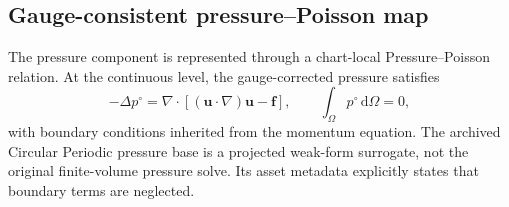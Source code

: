 \documentclass{article}
\begin{document}
\subsection{Gauge-consistent pressure--Poisson map}

The pressure component is represented through a chart-local
Pressure--Poisson relation.
At the continuous level, the gauge-corrected pressure satisfies
\begin{equation}
    -\Delta p^\circ
    =
    \nabla\!\cdot
    \left[
        (\bm u\!\cdot\!\nabla)\bm u
        -
        \bm f
    \right],
    \qquad
    \int_\Omega p^\circ\,\mathrm d\Omega=0,
    \label{eq:app_continuous_pressure_poisson}
\end{equation}
with boundary conditions inherited from the momentum equation. The archived Circular Periodic pressure base is a projected weak-form surrogate, not the original finite-volume pressure solve. Its asset metadata explicitly states that boundary terms are neglected.
\end{document}
